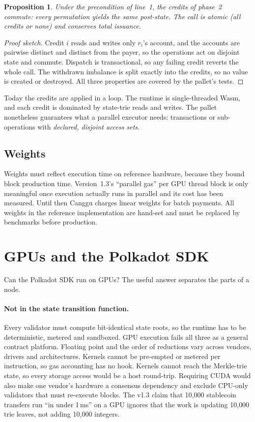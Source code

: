 \documentclass[11pt]{article}
\newtheorem{proposition}[theorem]{Proposition}
\theoremstyle{definition}
\theoremstyle{remark}
\begin{document}
\begin{proposition}
Under the precondition of line~1, the credits of phase~2 commute: every permutation yields the same
post-state. The call is atomic (all credits or none) and conserves total issuance.
\end{proposition}
\begin{proof}[Proof sketch]
Credit $i$ reads and writes only $r_i$'s account, and the accounts are pairwise distinct and distinct
from the payer, so the operations act on disjoint state and commute. Dispatch is transactional, so
any failing credit reverts the whole call. The withdrawn imbalance is split exactly into the credits,
so no value is created or destroyed. All three properties are covered by the pallet's tests.
\end{proof}

Today the credits are applied in a loop. The runtime is single-threaded Wasm, and each credit is
dominated by state-trie reads and writes. The pallet nonetheless guarantees what a parallel executor
needs: transactions or sub-operations with \emph{declared, disjoint access sets}.

\subsection{Weights}
Weights must reflect execution time on reference hardware, because they bound block production time.
Version~1.3's ``parallel gas'' per GPU thread block is only meaningful once execution actually runs in
parallel and its cost has been measured. Until then Canggu charges linear weights for batch payments.
All weights in the reference implementation are hand-set and must be replaced by benchmarks before
production.

\section{GPUs and the Polkadot SDK}
\label{sec:gpu}

Can the Polkadot SDK run on GPUs? The useful answer separates the parts of a node.

\paragraph{Not in the state transition function.} Every validator must compute bit-identical state
roots, so the runtime has to be deterministic, metered and sandboxed. GPU execution fails all three
as a general contract platform. Floating point and the order of reductions vary across vendors,
drivers and architectures. Kernels cannot be pre-empted or metered per instruction, so gas
accounting has no hook. Kernels cannot reach the Merkle-trie state, so every storage access would be
a host round-trip. Requiring CUDA would also make one vendor's hardware a consensus dependency and
exclude CPU-only validators that must re-execute blocks. The v1.3 claim that 10{,}000 stablecoin
transfers run ``in under 1\,ms'' on a GPU ignores that the work is updating 10{,}000 trie leaves,
not adding 10{,}000 integers.
\end{document}
